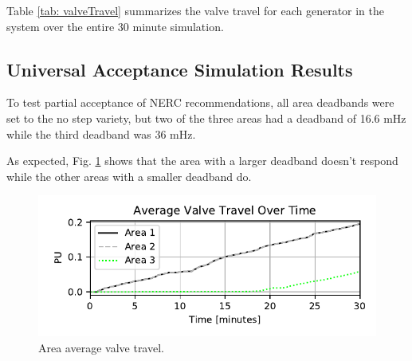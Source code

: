 Table \ref{tab: valveTravel} summarizes the valve travel for each generator in the system over the entire 30 minute simulation.




\subsection{Universal Acceptance Simulation Results}
To test partial acceptance of NERC recommendations, all area deadbands were set to the no step variety, but two of the three areas had a deadband of 16.6 mHz while the third deadband was 36 mHz.

As expected, Fig. \ref{fig: areaValveTravel} shows that the area with a larger deadband doesn't respond while the other areas with a smaller deadband do.
\begin{figure}[!ht]
\centering
\includegraphics[width=\linewidth]{figures/miniWECCuniAccVTOverTime}
\caption{Area average valve travel.}
\label{fig: areaValveTravel}
\end{figure}